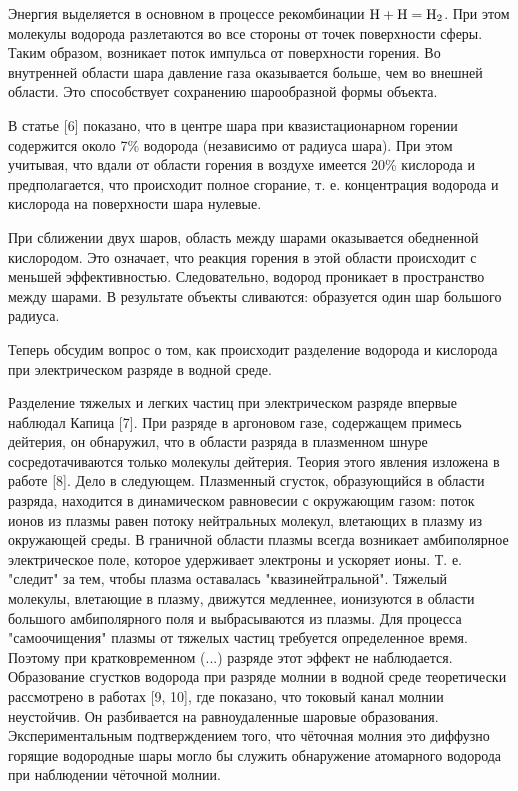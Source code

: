 \documentclass[a4paper]{article}
\begin{document}
Энергия выделяется в основном в процессе рекомбинации \(\ce{H} + \ce{H} = \ce{H2}\). При этом молекулы водорода разлетаются во все стороны от точек поверхности сферы. Таким образом, возникает поток импульса от поверхности горения. Во внутренней области шара давление газа оказывается больше, чем во внешней области. Это способствует сохранению шарообразной формы объекта. 

В статье [6] показано, что в центре шара при квазистационарном горении содержится около 7\% водорода (независимо от радиуса шара). При этом учитывая, что вдали от области горения в воздухе имеется 20\% кислорода и предполагается, что происходит полное сгорание, т. е. концентрация водорода и кислорода на поверхности шара нулевые.

При сближении двух шаров, область между шарами оказывается обедненной кислородом. Это означает, что реакция горения в этой области происходит с меньшей эффективностью. Следовательно, водород проникает в пространство между шарами. В результате объекты сливаются: образуется один шар большого радиуса.


Теперь обсудим вопрос о том, как происходит разделение водорода и кислорода при электрическом разряде в водной среде.

Разделение тяжелых и легких частиц при электрическом разряде впервые наблюдал Капица [7]. При разряде в аргоновом газе, содержащем примесь дейтерия, он обнаружил, что в области разряда в плазменном шнуре сосредотачиваются только молекулы дейтерия. Теория этого явления изложена в работе [8]. Дело в следующем. Плазменный сгусток, образующийся в области разряда, находится в динамическом равновесии с окружающим газом: поток ионов из плазмы равен потоку нейтральных молекул, влетающих в плазму из окружающей среды. В граничной области плазмы всегда возникает амбиполярное электрическое поле, которое удерживает электроны и ускоряет ионы. Т. е. "следит" за тем, чтобы плазма оставалась "квазинейтральной". Тяжелый молекулы, влетающие в плазму, движутся медленнее, ионизуются в области большого амбиполярного поля и выбрасываются из плазмы. Для процесса "самоочищения" плазмы от тяжелых частиц требуется определенное время. Поэтому при кратковременном (...) разряде этот эффект не наблюдается. Образование сгустков водорода при разряде молнии в водной среде теоретически рассмотрено в работах [9, 10], где показано, что токовый канал молнии неустойчив. Он разбивается на равноудаленные шаровые образования. Экспериментальным подтверждением того, что чёточная молния это диффузно горящие водородные шары могло бы служить обнаружение атомарного водорода при наблюдении чёточной молнии.
\end{document}
